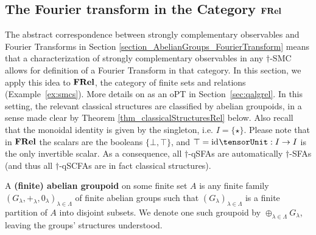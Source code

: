 \subsection{The Fourier transform in the Category $\mathbf{FRel}$}
\label{section_RelFT}


The abstract correspondence between strongly complementary observables and Fourier Transforms in Section \ref{section_AbelianGroups_FourierTransform} means that a characterization of strongly complementary observables in any $\dagger$-SMC allows for definition of a Fourier Transform in that category.  In this section, we apply this idea to $\mathbf{FRel}$, the category of finite sets and relations (Example~\ref{ex:smcs}). More details on  as an oPT in Section~\ref{sec:qalgrel}. In this setting, the relevant classical structures are classified by abelian groupoids, in a sense made clear by Theorem \ref{thm_classicalStructuresRel} below. Also recall that the monoidal identity is given by the singleton, i.e. $I = \{\star\}$. Please note that in $\mathbf{FRel}$ the scalars are the booleans $\{\bot,\top\}$, and $\top = \id{\tensorUnit}: I \rightarrow I$ is the only invertible scalar. As a consequence, all $\dagger$-qSFAs are automatically $\dagger$-SFAs (and thus all $\dagger$-qSCFAs are in fact classical structures). 

\begin{defn}
A \textbf{(finite) abelian groupoid} on some finite set $A$ is any finite family $(G_\lambda,+_\lambda,0_\lambda)_{\lambda \in \Lambda}$ of finite abelian groups such that $(G_\lambda)_{\lambda \in \Lambda}$ is a finite partition of $A$ into disjoint subsets. We denote one such groupoid by $\oplus_{\lambda \in \Lambda} G_\lambda$, leaving the groups' structures understood.
\end{defn}

